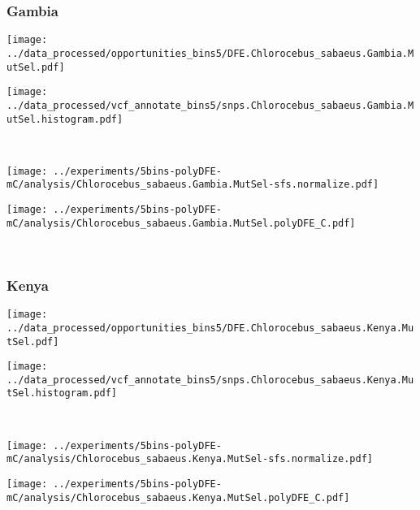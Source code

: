 \subsubsection{Gambia}

\begin{minipage}{0.49\linewidth}
    \texttt{[image: ../data\_processed/opportunities\_bins5/DFE.Chlorocebus\_sabaeus.Gambia.MutSel.pdf]}
\end{minipage}
\begin{minipage}{0.49\linewidth}
    \texttt{[image: ../data\_processed/vcf\_annotate\_bins5/snps.Chlorocebus\_sabaeus.Gambia.MutSel.histogram.pdf]}
\end{minipage}
\\
\begin{minipage}{0.49\linewidth}
    \texttt{[image: ../experiments/5bins-polyDFE-mC/analysis/Chlorocebus\_sabaeus.Gambia.MutSel-sfs.normalize.pdf]}
\end{minipage}
\begin{minipage}{0.49\linewidth}
    \texttt{[image: ../experiments/5bins-polyDFE-mC/analysis/Chlorocebus\_sabaeus.Gambia.MutSel.polyDFE\_C.pdf]}
\end{minipage}
\\

\subsubsection{Kenya}

\begin{minipage}{0.49\linewidth}
    \texttt{[image: ../data\_processed/opportunities\_bins5/DFE.Chlorocebus\_sabaeus.Kenya.MutSel.pdf]}
\end{minipage}
\begin{minipage}{0.49\linewidth}
    \texttt{[image: ../data\_processed/vcf\_annotate\_bins5/snps.Chlorocebus\_sabaeus.Kenya.MutSel.histogram.pdf]}
\end{minipage}
\\
\begin{minipage}{0.49\linewidth}
    \texttt{[image: ../experiments/5bins-polyDFE-mC/analysis/Chlorocebus\_sabaeus.Kenya.MutSel-sfs.normalize.pdf]}
\end{minipage}
\begin{minipage}{0.49\linewidth}
    \texttt{[image: ../experiments/5bins-polyDFE-mC/analysis/Chlorocebus\_sabaeus.Kenya.MutSel.polyDFE\_C.pdf]}
\end{minipage}
\\

